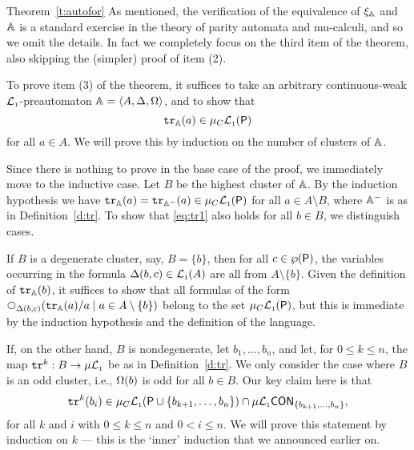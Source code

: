 \begin{proofof}{Theorem~\ref{t:autofor}}
As mentioned, the verification of the equivalence of $\xi_{\mathbb{A}}$ and $\mathbb{A}$
is a standard exercise in the theory of parity automata and mu-calculi, and so
we omit the details.
In fact we completely focus on the third item of the theorem, also skipping the 
(simpler) proof of item (2).

To prove item (3) of the theorem, it suffices to take an arbitrary
continuous-weak $\mathcal{L}_{\scriptscriptstyle 1}$-preautomaton $\mathbb{A} = \langle{A,\Delta,\Omega}\rangle$, and to show
that 
\begin{equation}
\label{eq:tr1}
\ytr_{\bbA}(a) \in \mu_{C}\llang(\props)
\end{equation}
for all $a \in A$.
We will prove this by induction on the number of clusters of $\mathbb{A}$.

Since there is nothing to prove in the base case of the proof, we immediately
move to the inductive case.
Let $B$ be the highest cluster of $\mathbb{A}$.
By the induction hypothesis we have $\mathtt{tr}_{\mathbb{A}}(a) = \mathtt{tr}_{\mathbb{A}^{-}}(a) \in 
\mu_{C}\mathcal{L}_{\scriptscriptstyle 1}(\mathsf{P})$ for all $a \in A \setminus B$, where 
$\mathbb{A}^{-}$ is as in Definition~\ref{d:tr}.
To show that \eqref{eq:tr1} also holds for all $b \in B$, we distinguish cases.

If $B$ is a degenerate cluster, say, $B = \{ b \}$, then for all $c \in 
\wp(\mathsf{P})$, the variables occurring in the formula $\Delta(b,c) \in \mathcal{L}_{\scriptscriptstyle 1}(A)$
are all from $A \setminus \{ b \}$.
Given the definition of $\mathtt{tr}_{\mathbb{A}}(b)$, it suffices to show that all formulas 
of the form $\nxt{\tmap(b,c)}(\ytr_{\bbA}(a)/a \mid a \in A \setminus \{ b \})$
belong to the set $\mu_{C}\mathcal{L}_{\scriptscriptstyle 1}(\mathsf{P})$, but this is immediate by the 
induction hypothesis and the definition of the language.

If, on the other hand, $B$ is nondegenerate, let $b_{1},\ldots,b_{n}$, and let,
for $0\leq k \leq n$, the map $\mathtt{tr}^{k}: B \to \mu\mathcal{L}_{\scriptscriptstyle 1}$ be as in
Definition~\ref{d:tr}.
We only consider the case where $B$ is an odd cluster, i.e., $\Omega(b)$ is odd
for all $b \in B$.
Our key claim here is that 
\begin{equation}
\label{eq:tr2}
\ytr^{k}(b_{i}) \in \mu_{C}\llang(\props \cup \{ b_{k+1},\ldots,b_{n}\}) \cap 
\cont{\mu\llang}{\{ b_{k+1},\ldots,b_{n}\}},
\end{equation}
for all $k$ and $i$ with $0 \leq k \leq n$ and $0 < i \leq n$.
We will prove this statement by induction on $k$ --- this is the `inner' 
induction that we announced earlier on.


\end{proofof}
